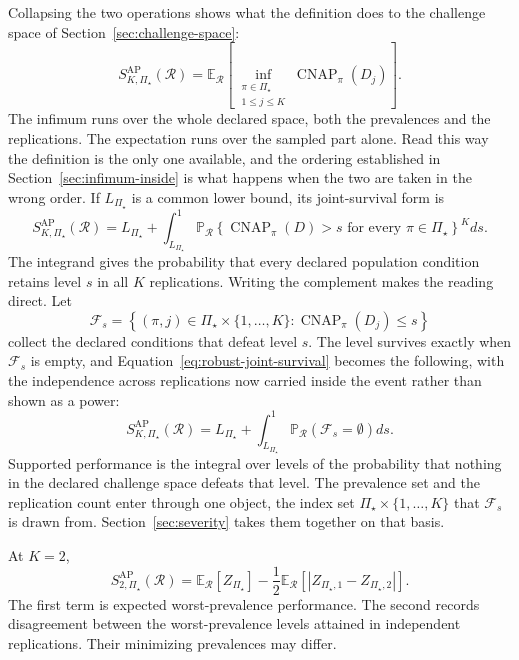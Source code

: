 \documentclass[11pt]{article}
\newcommand{\CNAP}{\operatorname{CNAP}}
\newcommand{\Regime}{\mathcal{R}}
\newcommand{\PSet}{\Pi_\star}
\newcommand{\E}{\mathbb{E}}
\newcommand{\Prb}{\mathbb{P}}
\newcommand{\SRob}{S_{K,\PSet}^{\mathrm{AP}}(\Regime)}
\newcommand{\RefSet}{\mathcal{F}}
\theoremstyle{remark}
\begin{document}
Collapsing the two operations shows what the definition does to the challenge space of Section~\ref{sec:challenge-space}:
\[
\SRob
=
\E_{\Regime}
\left[
\inf_{\substack{\pi\in\PSet\\1\leq j\leq K}}
\CNAP_\pi(D_j)
\right].
\]
The infimum runs over the whole declared space, both the prevalences and the replications. The expectation runs over the sampled part alone. Read this way the definition is the only one available, and the ordering established in Section~\ref{sec:infimum-inside} is what happens when the two are taken in the wrong order.
If $L_{\PSet}$ is a common lower bound, its joint-survival form is
\begin{equation}
\SRob
=
L_{\PSet}
+
\int_{L_{\PSet}}^1
\Prb_{\Regime}
\left\{
\CNAP_\pi(D)>s
\text{ for every }\pi\in\PSet
\right\}^{K}
ds.
\label{eq:robust-joint-survival}
\end{equation}
The integrand gives the probability that every declared population condition retains level $s$ in all $K$ replications. Writing the complement makes the reading direct. Let
\begin{equation}
\RefSet_s
=
\left\{
(\pi,j)\in\PSet\times\{1,\ldots,K\}
:
\CNAP_\pi(D_j)\leq s
\right\}
\label{eq:refutation-class}
\end{equation}
collect the declared conditions that defeat level $s$. The level survives exactly when $\RefSet_s$ is empty, and Equation~\eqref{eq:robust-joint-survival} becomes the following, with the independence across replications now carried inside the event rather than shown as a power:
\begin{equation}
\SRob
=
L_{\PSet}
+
\int_{L_{\PSet}}^{1}
\Prb_{\Regime}
\left(
\RefSet_s=\emptyset
\right)
ds .
\label{eq:refutation-integral}
\end{equation}
Supported performance is the integral over levels of the probability that nothing in the declared challenge space defeats that level. The prevalence set and the replication count enter through one object, the index set $\PSet\times\{1,\ldots,K\}$ that $\RefSet_s$ is drawn from. Section~\ref{sec:severity} takes them together on that basis.

At $K=2$,
\begin{equation}
S_{2,\PSet}^{\mathrm{AP}}(\Regime)
=
\E_{\Regime}[Z_{\PSet}]
-
\frac12
\E_{\Regime}
\left[
|Z_{\PSet,1}-Z_{\PSet,2}|
\right].
\label{eq:robust-k2}
\end{equation}
The first term is expected worst-prevalence performance. The second records disagreement between the worst-prevalence levels attained in independent replications. Their minimizing prevalences may differ.
\end{document}
